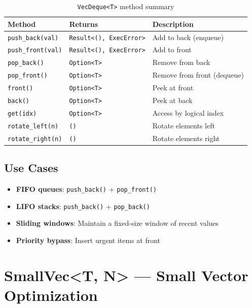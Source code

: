 \begin{table}[h]
\centering
\begin{tabular}{lll}
\textbf{Method} & \textbf{Returns} & \textbf{Description} \\
\hline
\texttt{push\_back(val)} & \texttt{Result<(), ExecError>} & Add to back (enqueue) \\
\texttt{push\_front(val)} & \texttt{Result<(), ExecError>} & Add to front \\
\texttt{pop\_back()} & \texttt{Option<T>} & Remove from back \\
\texttt{pop\_front()} & \texttt{Option<T>} & Remove from front (dequeue) \\
\texttt{front()} & \texttt{Option<T>} & Peek at front \\
\texttt{back()} & \texttt{Option<T>} & Peek at back \\
\texttt{get(idx)} & \texttt{Option<T>} & Access by logical index \\
\texttt{rotate\_left(n)} & \texttt{()} & Rotate elements left \\
\texttt{rotate\_right(n)} & \texttt{()} & Rotate elements right \\
\end{tabular}
\caption{\texttt{VecDeque<T>} method summary}
\end{table}

\subsection{Use Cases}

\begin{itemize}
    \item \textbf{FIFO queues}: \texttt{push\_back()} + \texttt{pop\_front()}
    \item \textbf{LIFO stacks}: \texttt{push\_back()} + \texttt{pop\_back()}
    \item \textbf{Sliding windows}: Maintain a fixed-size window of recent values
    \item \textbf{Priority bypass}: Insert urgent items at front
\end{itemize}

\section{SmallVec<T, N> --- Small Vector Optimization}
\label{sec:smallvec}

